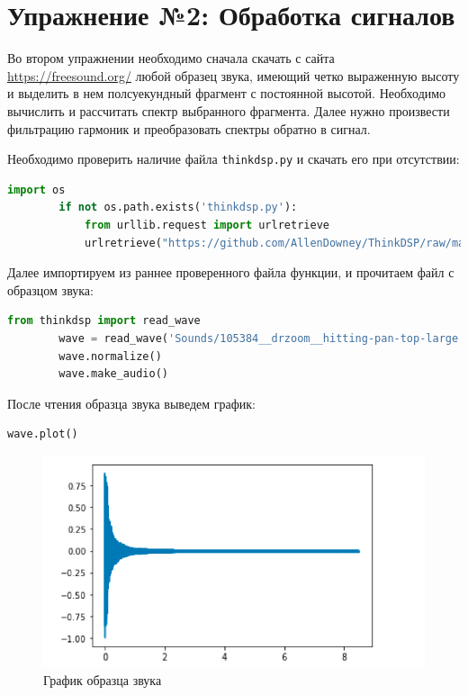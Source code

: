 \documentclass[a4]{article}
\begin{document}
    \newpage


    \section{Упражнение №2: Обработка сигналов}
    \label{sec:2_signal_processing}

    Во втором упражнении необходимо сначала скачать с сайта \href{https://freesound.org/}{https://freesound.org/} любой образец звука, имеющий четко выраженную высоту и выделить в нем полсуекундный фрагмент с постоянной высотой.
    Необходимо вычислить и рассчитать спектр выбранного фрагмента.
    Далее нужно произвести фильтрацию гармоник и преобразовать спектры обратно в сигнал.

    Необходимо проверить наличие файла \texttt{thinkdsp.py} и скачать его при отсутствии:

    \begin{lstlisting}[language=Python, caption= Проверка наличия \texttt{thinkdsp.py}, label={lst:check_thinkdsp}]
        import os
        if not os.path.exists('thinkdsp.py'):
            from urllib.request import urlretrieve
            urlretrieve("https://github.com/AllenDowney/ThinkDSP/raw/master/code/thinkdsp.py", "thinkdsp.py")
    \end{lstlisting}

    Далее импортируем из раннее проверенного файла функции, и прочитаем файл с образцом звука:

    \begin{lstlisting}[language=Python, caption= Чтение скаченного образца звука, label={lst:read_wav}]
        from thinkdsp import read_wave
        wave = read_wave('Sounds/105384__drzoom__hitting-pan-top-large.wav')
        wave.normalize()
        wave.make_audio()
    \end{lstlisting}

    После чтения образца звука выведем график:

    \begin{lstlisting}[language=Python, caption= Вывод графика образца,label={lst:wav_plot}]
        wave.plot()
    \end{lstlisting}

    \begin{figure}[H]
        \centering
        \includegraphics[width=\textwidth]{wav_plot_1}
        \caption{График образца звука}
        \label{fig:plot_wav_1}
    \end{figure}
\end{document}
